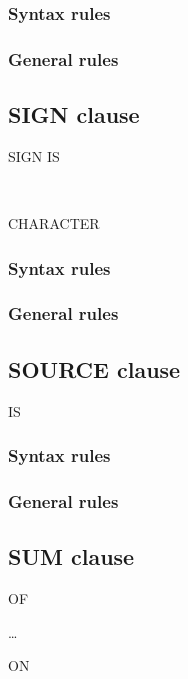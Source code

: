 \subsubsection{Syntax rules}

\subsubsection{General rules}

\subsection{SIGN clause}
\begin{syntax}
  SIGN IS
  \begin{1=}
     \\
  \end{1=}
  \begin{0-1}
     CHARACTER
  \end{0-1}
\end{syntax}

\subsubsection{Syntax rules}

\subsubsection{General rules}

\subsection{SOURCE clause}
\begin{syntax}
   IS 
  \begin{0-1}
  \end{0-1}
\end{syntax}

\subsubsection{Syntax rules}

\subsubsection{General rules}

\subsection{SUM clause}
\begin{syntax}
   OF
  \begin{1=}
  \end{1=}\ldots
  \begin{0-1}
     ON
    \begin{1=}
      \identifier \\
    \end{1=}
  \end{0-1}
\end{syntax}

